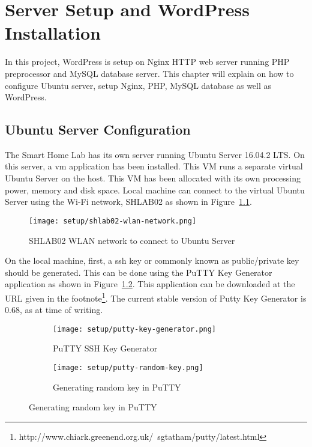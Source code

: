 \chapter{Server Setup and WordPress Installation}

In this project, WordPress is setup on Nginx HTTP web server running PHP preprocessor and MySQL database server. This chapter will explain on how to configure Ubuntu server, setup Nginx, PHP, MySQL database as well as WordPress.

\section{Ubuntu Server Configuration} \label{sec:ubuntu-server-configuration}
The Smart Home Lab has its own server running Ubuntu Server 16.04.2 LTS. On this server, a \ac{vm} application has been installed. This VM runs a separate virtual Ubuntu Server on the host. This VM has been allocated with its own processing power, memory and disk space. Local machine can connect to the virtual Ubuntu Server using the Wi-Fi network, SHLAB02 as shown in Figure~\ref{fig:shlab02-wlan-network}.

\begin{figure}[ht]
\caption{SHLAB02 WLAN network to connect to Ubuntu Server}
\label{fig:shlab02-wlan-network}
\centering
\texttt{[image: setup/shlab02-wlan-network.png]}
\end{figure}

On the local machine, first, a \ac{ssh} key or commonly known as public/private key should be generated. This can be done using the PuTTY Key Generator application as shown in Figure~\ref{fig:putty-key-generator}. This application can be downloaded at the URL given in the footnote\footnote{http://www.chiark.greenend.org.uk/~sgtatham/putty/latest.html}. The current stable version of Putty Key Generator is 0.68, as at time of writing.

\begin{figure}[ht]
	\begin{subfigure}{.49\linewidth}
	\caption{PuTTY SSH Key Generator}
	\label{fig:putty-key-generator}
	\texttt{[image: setup/putty-key-generator.png]}
	\end{subfigure}
	\begin{subfigure}{.49\linewidth}
	\caption{Generating random key in PuTTY}
	\label{fig:putty-random-key}
	\texttt{[image: setup/putty-random-key.png]}
	\end{subfigure}
\end{figure}

